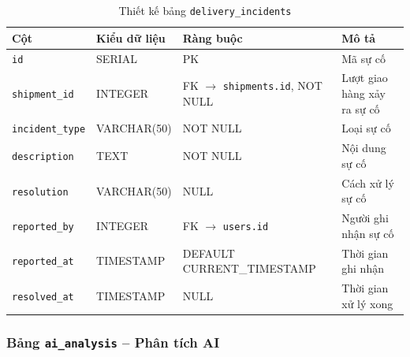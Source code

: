 \begin{table}[H]
\centering
\caption{Thiết kế bảng \texttt{delivery\_incidents}}
\begin{tabularx}{\textwidth}{|l|l|Z|Z|}
\hline
\textbf{Cột} &
\textbf{Kiểu dữ liệu} &
\textbf{Ràng buộc} &
\textbf{Mô tả} \\ \hline

\texttt{id}
& SERIAL
& PK
& Mã sự cố \\ \hline

\texttt{shipment\_id}
& INTEGER
& FK $\rightarrow$ \texttt{shipments.id}, NOT NULL
& Lượt giao hàng xảy ra sự cố \\ \hline

\texttt{incident\_type}
& VARCHAR(50)
& NOT NULL
& Loại sự cố \\ \hline

\texttt{description}
& TEXT
& NOT NULL
& Nội dung sự cố \\ \hline

\texttt{resolution}
& VARCHAR(50)
& NULL
& Cách xử lý sự cố \\ \hline

\texttt{reported\_by}
& INTEGER
& FK $\rightarrow$ \texttt{users.id}
& Người ghi nhận sự cố \\ \hline

\texttt{reported\_at}
& TIMESTAMP
& DEFAULT CURRENT\_TIMESTAMP
& Thời gian ghi nhận \\ \hline

\texttt{resolved\_at}
& TIMESTAMP
& NULL
& Thời gian xử lý xong \\ \hline

\end{tabularx}
\end{table}



\subsubsection{Bảng \texttt{ai\_analysis} -- Phân tích AI}

